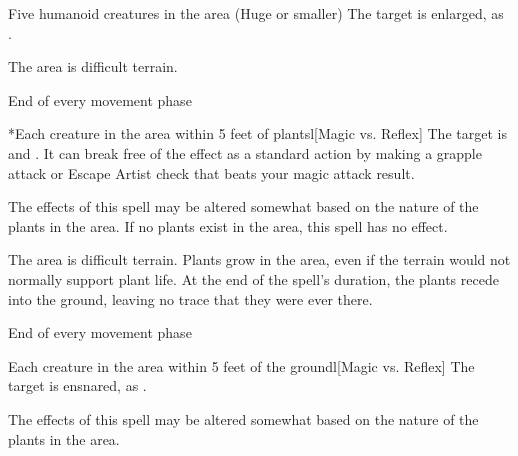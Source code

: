 \spelldur{\durshort \dismissable}
\begin{spelltarget}{Five humanoid creatures in the area (Huge or smaller)}
    \spelleffect The target is enlarged, as .
\end{spelltarget}

\spelldur{\durshort \dismissable}
\spellline
\spelleffect The area is difficult terrain.
\begin{spelltrigger}{End of every movement phase}
    \begin{spelltarget}*{Each creature in the area within 5 feet of plants}l[Magic vs. Reflex]
        \spellsuccess The target is \entangled and \immobilized. It can break free of the effect as a standard action by making a grapple attack or Escape Artist check that beats your magic attack result.
    \end{spelltarget}
\end{spelltrigger}
\spellnotes The effects of this spell may be altered somewhat based on the nature of the plants in the area. If no plants exist in the area, this spell has no effect.

\spelldur{\durshort \dismissable}
\spellline
\spelleffect The area is difficult terrain. Plants grow in the area, even if the terrain would not normally support plant life. At the end of the spell's duration, the plants recede into the ground, leaving no trace that they were ever there.
\begin{spelltrigger}{End of every movement phase}
    \begin{spelltarget}{Each creature in the area within 5 feet of the ground}l[Magic vs. Reflex]
        \spellsuccess The target is ensnared, as .
    \end{spelltarget}
\end{spelltrigger}
\spellnotes The effects of this spell may be altered somewhat based on the nature of the plants in the area.

